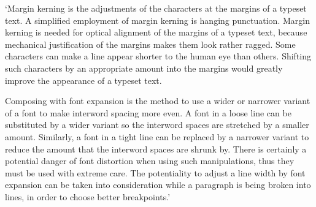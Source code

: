 \documentclass{article}
\begin{document}
 `Margin kerning is the adjustments of the characters at the margins of a
  typeset text. A simplified employment of margin kerning is hanging
  punctuation. Margin kerning is needed for optical alignment of the margins
  of a typeset text, because mechanical justification of the margins makes
  them look rather ragged. Some characters can make a line appear shorter to
  the human eye than others. Shifting such characters by an appropriate
  amount into the margins would greatly improve the appearance of a typeset
  text.

  Composing with font expansion is the method to use a wider or narrower
  variant of a font to make interword spacing more even. A font in a loose
  line can be substituted by a wider variant so the interword spaces are
  stretched by a smaller amount. Similarly, a font in a tight line can be
  replaced by a narrower variant to reduce the amount that the interword
  spaces are shrunk by. There is certainly a potential danger of font
  distortion when using such manipulations, thus they must be used with
  extreme care. The potentiality to adjust a line width by font expansion can
  be taken into consideration while a paragraph is being broken into lines,
  in order to choose better breakpoints.'
\end{document}
